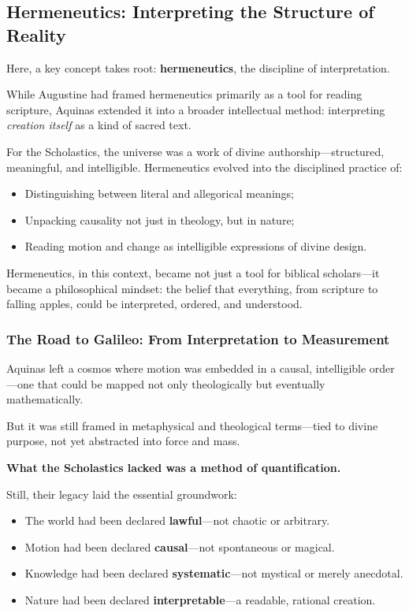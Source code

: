 \subsection{Hermeneutics: Interpreting the Structure of Reality}

Here, a key concept takes root: \textbf{hermeneutics}, the discipline of interpretation.

While Augustine had framed hermeneutics primarily as a tool for reading scripture, Aquinas extended it into a broader intellectual method: interpreting \textit{creation itself} as a kind of sacred text.

For the Scholastics, the universe was a work of divine authorship—structured, meaningful, and intelligible. Hermeneutics evolved into the disciplined practice of:

\begin{itemize}
    \item Distinguishing between literal and allegorical meanings;
    \item Unpacking causality not just in theology, but in nature;
    \item Reading motion and change as intelligible expressions of divine design.
\end{itemize}

Hermeneutics, in this context, became not just a tool for biblical scholars—it became a philosophical mindset: the belief that everything, from scripture to falling apples, could be interpreted, ordered, and understood.

\subsubsection{The Road to Galileo: From Interpretation to Measurement}

Aquinas left a cosmos where motion was embedded in a causal, intelligible order—one that could be mapped not only theologically but eventually mathematically.  

But it was still framed in metaphysical and theological terms—tied to divine purpose, not yet abstracted into force and mass.

\textbf{What the Scholastics lacked was a method of quantification.}

Still, their legacy laid the essential groundwork:

\begin{itemize}
    \item The world had been declared \textbf{lawful}—not chaotic or arbitrary.
    \item Motion had been declared \textbf{causal}—not spontaneous or magical.
    \item Knowledge had been declared \textbf{systematic}—not mystical or merely anecdotal.
    \item Nature had been declared \textbf{interpretable}—a readable, rational creation.
\end{itemize}

